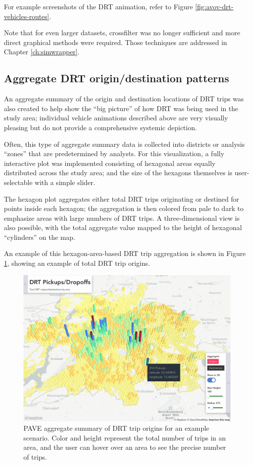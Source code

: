 For example screenshots of the DRT animation, refer to Figure \ref{fig:avov-drt-vehicles-routes}.

Note that for even larger datasets, crossfilter was no longer sufficient and more direct graphical methods were required. Those techniques are addressed in Chapter \ref{ch:simwrapper}.

\subsection{Aggregate DRT origin/destination patterns}
\label{pave-od-hexagons}

An aggregate summary of the origin and destination locations of DRT trips was also created to help show the ``big picture'' of how DRT was being used in the study area; individual vehicle animations described above are very visually pleasing but do not provide a comprehensive systemic depiction.

Often, this type of aggregate summary data is collected into districts or analysis ``zones'' that are predetermined by analysts. For this visualization, a fully interactive plot was implemented consisting of hexagonal areas equally distributed across the study area; and the size of the hexagons themselves is user-selectable with a simple slider.

The hexagon plot aggregates either total DRT trips originating or destined for points inside each hexagon; the aggregation is then colored from pale to dark to emphasize areas with large numbers of DRT trips. A three-dimensional view is also possible, with the total aggregate value mapped to the height of hexagonal ``cylinders'' on the map.

An example of this hexagon-area-based DRT trip aggregation is shown in Figure \ref{fig:pave-xy-origins}, showing an example of total DRT trip origins.

\begin{figure}[ht]
\centering
  \includegraphics[width=0.95\linewidth]{chapters/23-pave/images/fig-xy-origins.png}
\caption{PAVE aggregate summary of DRT trip origins for an example scenario. Color and height represent the total number of trips in an area, and the user can hover over an area to see the precise number of trips.}
\label{fig:pave-xy-origins}
\end{figure}

